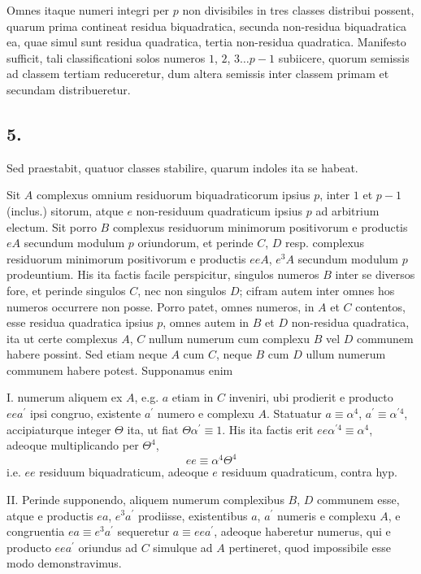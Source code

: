 \documentclass[twoside,12pt, showframe]{memoir}
\begin{document}
Omnes itaque numeri integri per \(p\) non divisibiles in tres classes distribui possent, quarum prima contineat residua biquadratica, secunda non-residua biquadratica ea, quae simul sunt residua quadratica, tertia non-residua quadratica. Manifesto sufficit, tali classificationi solos numeros \(1\), \(2\), \(3 \ldots p-1\) subiicere, quorum semissis ad classem tertiam reduceretur, dum altera semissis inter classem primam et secundam distribueretur.

\subsection*{5.}
 
Sed praestabit, quatuor classes stabilire, quarum indoles ita se habeat.
 
Sit \(A\) complexus omnium residuorum biquadraticorum ipsius \(p\), inter \(1\) et \(p-1\) (inclus.) sitorum, atque \(e\) non-residuum quadraticum ipsius \(p\) ad arbitrium electum. Sit porro \(B\) complexus residuorum minimorum positivorum e productis \(e A\) secundum modulum \(p\) oriundorum, et perinde \(C\), \(D\) resp. complexus residuorum minimorum positivorum e productis \(e e A\), \(e^{3} A\) secundum modulum \(p\) prodeuntium. His ita factis facile perspicitur, singulos numeros \(B\) inter se diversos fore, et perinde singulos \(C\), nec non singulos \(D\); cifram autem inter omnes hos numeros occurrere non posse. Porro patet, omnes numeros, in \(A\) et \(C\) contentos, esse residua quadratica ipsius \(p\), omnes autem in \(B\) et \(D\) non-residua quadratica, ita ut certe complexus \(A\), \(C\) nullum numerum cum complexu \(B\) vel \(D\) communem habere possint. Sed etiam neque \(A\) cum \(C\), neque \(B\) cum \(D\) ullum numerum communem habere potest. Supponamus enim
 
I. numerum aliquem ex \(A\), e.g. \(a\) etiam in \(C\) inveniri, ubi prodierit e producto \(e e a^{\prime}\) ipsi congruo, existente \(a^{\prime}\) numero e complexu \(A\). Statuatur \(a \equiv \alpha^{4}\), \(a^{\prime} \equiv \alpha^{\prime 4}\), accipiaturque integer \(\Theta\) ita, ut fiat \(\Theta \alpha^{\prime} \equiv 1\). His ita factis erit \(e e \alpha^{\prime 4} \equiv \alpha^{4}\), adeoque multiplicando per \(\Theta^{4}\),
\[e e \equiv \alpha^{4} \Theta^{4}\]
i.e. \(ee\) residuum biquadraticum, adeoque \(e\) residuum quadraticum, contra hyp.\clearpage\noindent%
 
II. Perinde supponendo, aliquem numerum complexibus \(B\), \(D\) communem esse, atque e productis \(e a\), \(e^{3} a^{\prime}\) prodiisse, existentibus \(a\), \(a^{\prime}\) numeris e complexu \(A\), e congruentia \(e a \equiv e^{3} a^{\prime}\) sequeretur \(a \equiv e e a^{\prime}\), adeoque haberetur numerus, qui e producto \(e e a^{\prime}\) oriundus ad \(C\) simulque ad \(A\) pertineret, quod impossibile esse modo demonstravimus.
\end{document}
